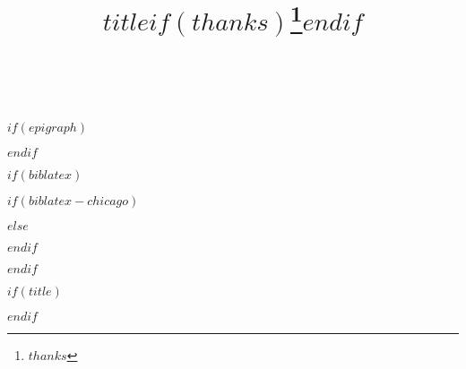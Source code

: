 
$if(epigraph)$
\usepackage{epigraph}
\renewcommand{\epigraphsize}{\footnotesize}
\setlength{\epigraphrule}{0em}
\setlength{\beforeepigraphskip}{-2em}
\setlength{\afterepigraphskip}{1em}
$endif$

$if(biblatex)$
\usepackage{csquotes}
$if(biblatex-chicago)$
\usepackage[$if(biblio-style)$$biblio-style$,$endif$$for(biblatexoptions)$$biblatexoptions$$sep$,$endfor$]{biblatex-chicago}
$else$
\usepackage[$if(biblio-style)$style=$biblio-style$,$endif$$for(biblatexoptions)$$biblatexoptions$$sep$,$endfor$]{biblatex}
$endif$

\setlength\bibitemsep{0pt}  %
\renewcommand*{\bibfont}{\footnotesize}  %
\setlength\bibhang{\parindent}  %



$endif$

\usepackage{orcidlink}  %

$if(title)$
\title{\MakeUppercase{$title$}$if(thanks)$\thanks{$thanks$}$endif$\\~}
$endif$




